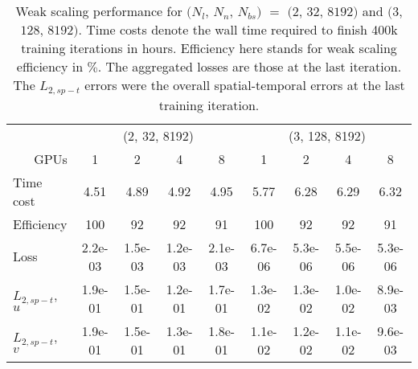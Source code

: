 \begin{table}[hbt!]
\centering
\singlespacing
\caption[
    PINNs, 2D TGV, $Re=100$: weak scaling performance for $(N_l$, $N_n$, $N_{bs})$ $=$ $(2$, $32$, $8192)$ and $(3$, $128$, $8192)$
]{
    Weak scaling performance for $(N_l$, $N_n$, $N_{bs})$ $=$ $(2$, $32$, $8192)$ and $(3$, $128$, $8192)$.%
    Time costs denote the wall time required to finish 400k training iterations in hours.%
    Efficiency here stands for weak scaling efficiency in $\%$.%
    The aggregated losses are those at the last iteration.%
    The $L_{2, sp-t}$ errors were the overall spatial-temporal errors at the last training iteration.%
}
\label{table:weak-scaling-perf}
\small
\begin{tabular}{lcccccccc}
\toprule
 & \multicolumn{4}{c}{(2, 32, 8192)} & \multicolumn{4}{c}{(3, 128, 8192)} \\
\cmidrule(rl){2-5} \cmidrule(rl){6-9}
\multicolumn{1}{r}{GPUs} & 1 & 2 & 4 & 8 & 1 & 2 & 4 & 8 \\
\midrule
Time cost &  4.51 &  4.89 &  4.92 &  4.95 &  5.77 &  6.28 &  6.29 &  6.32 \\
\addlinespace
Efficiency & 100 & 92 & 92 & 91 & 100 & 92 & 92 & 91 \\
\addlinespace
Loss & 2.2e-03 & 1.5e-03 & 1.2e-03 & 2.1e-03 & 6.7e-06 & 5.3e-06 & 5.5e-06 & 5.3e-06 \\
\addlinespace
$L_{2,sp-t}$, $u$ & 1.9e-01 & 1.5e-01 & 1.2e-01 & 1.7e-01 & 1.3e-02 & 1.3e-02 & 1.0e-02 & 8.9e-03 \\
\addlinespace
$L_{2,sp-t}$, $v$ & 1.9e-01 & 1.5e-01 & 1.3e-01 & 1.8e-01 & 1.1e-02 & 1.2e-02 & 1.1e-02 & 9.6e-03 \\
\bottomrule
\end{tabular}
\normalsize
\end{table}
